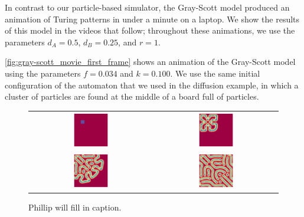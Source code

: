 In contrast to our particle-based simulator, the Gray-Scott model produced an animation of Turing patterns in under a minute on a laptop. We show the results of this model in the videos that follow; throughout these animations, we use the parameters $d_A = 0.5$, $d_B = 0.25$, and $r = 1$.

\autoref{fig:gray-scott_movie_first_frame} shows an animation of the Gray-Scott model using the parameters  $f = 0.034$ and $k = 0.100$. We use the same initial configuration of the automaton that we used in the diffusion example, in which a cluster of  particles are found at the middle of a board full of  particles.\\

\begin{figure}[h]
\centering
\mySfFamily
\begin{tabular}{c c}
\includegraphics[width = 0.3\textwidth]{../images/gs_f038_k100_Moment_1.png} & \includegraphics[width = 0.3\textwidth]{../images/gs_f038_k100_Moment_2.png} \\[2ex]
\includegraphics[width = 0.3\textwidth]{../images/gs_f038_k100_Moment_3.png} & \includegraphics[width = 0.3\textwidth]{../images/gs_f038_k100_Moment_4.png}
\end{tabular}
\caption{Phillip will fill in caption.}
\label{fig:gray-scott_movie_first_frame}
\end{figure}

